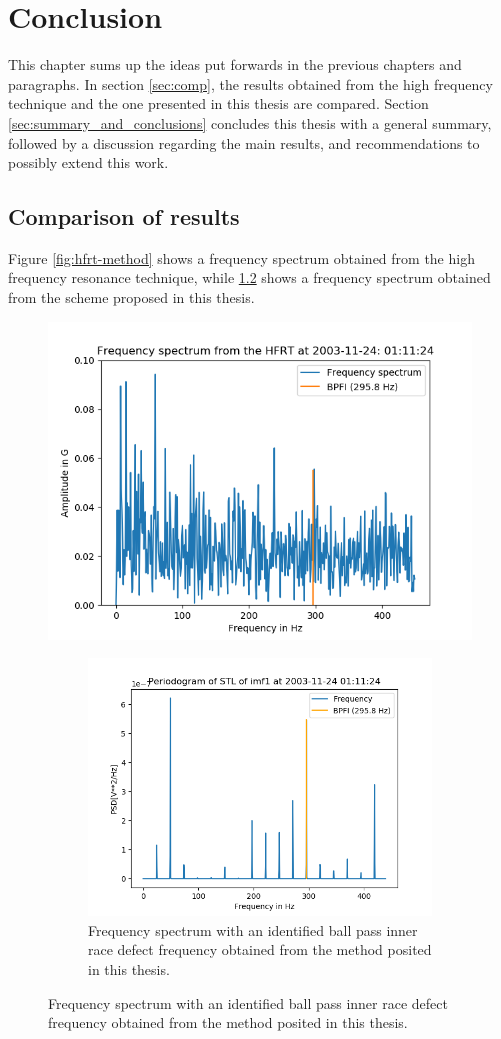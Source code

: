 \documentclass[../Main/thesis.tex]{subfiles}
\begin{document}
	\chapter[Conclusions]{Conclusion}
	\label{sec:conclusions}
	 This chapter sums up the ideas put forwards in the previous chapters and paragraphs. In section \ref{sec:comp}, the results obtained from the high frequency technique and the one presented in this thesis are compared.
	 Section \ref{sec:summary_and_conclusions} concludes this thesis with a general summary, followed by a discussion regarding the main results, and recommendations to possibly extend this work.

	
	\section{Comparison of results}
	Figure \ref{fig:hfrt-method} shows a frequency spectrum obtained from the high frequency resonance technique, while \ref{fig:yapi-method} shows a frequency spectrum obtained from the scheme proposed in this thesis.
	\begin{figure}[H]
		\centering
		\includegraphics[width=0.7\linewidth]{../fig/hfrt}
		\caption{Frequency spectrum with an identified ball pass inner race defect frequency obtained from the high frequency resonance technique (HFRT).}
		\label{fig:hfrt-method}
		
		\begin{figure}[H]
			\centering
			\includegraphics[width=0.7\linewidth]{../fig/periodogram_bpfi/end_imf1_bpfi}
			\caption{Frequency spectrum with an identified ball pass inner race defect frequency obtained from the method posited in this thesis.}
			\label{fig:yapi-method}
		\end{figure}
	\end{figure}
	\label{sec:comp}
\end{document}
